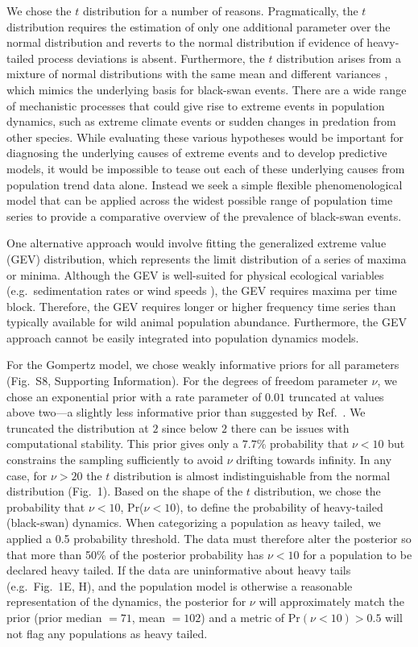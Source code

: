 \documentclass[9pt,twocolumn,twoside]{pnas-new}
\newcommand{\figpriors}{{8}}
\begin{document}
{We chose the $t$ distribution for a number of reasons.
Pragmatically, the $t$ distribution requires the estimation of only one additional
parameter over the normal distribution and reverts to the normal distribution
if evidence of heavy-tailed process deviations is absent.
Furthermore, the $t$ distribution arises from a mixture of normal distributions
with the same mean and different variances \cite{gelman2014},
which mimics the underlying basis for black-swan events.
There are a wide range of mechanistic processes
that could give rise to extreme events in population dynamics,
such as extreme climate events
\cite{meehl2004, katz2005, ipcc2012}
or sudden changes in predation from other species.
While evaluating these various hypotheses
would be important for diagnosing the underlying causes
of extreme events and to develop predictive models,
it would be impossible to tease out each of these
underlying causes from population trend data alone.
Instead we seek a simple flexible phenomenological model
that can be applied across the widest possible
range of population time series to provide a
comparative overview of the prevalence
of black-swan events.

One alternative approach would involve fitting
the generalized extreme value (GEV) distribution,
which represents the limit distribution of a series of maxima or minima.
Although the GEV is well-suited for physical ecological variables
(e.g.\ sedimentation rates or wind speeds \cite{gaines1993, denny2009}),
the GEV requires maxima per time block.
Therefore, the GEV requires longer or higher frequency time series than typically available
for wild animal population abundance.
Furthermore, the GEV approach cannot be easily integrated into population dynamics models.

For the Gompertz model,
we chose weakly informative priors for
all parameters (Fig.~S\figpriors, Supporting Information).
For the degrees of freedom parameter $\nu$,
we chose an exponential prior
with a rate parameter
of \(0.01\) truncated at values above two---a slightly less informative prior
than suggested by Ref.~\cite{fernandez1998}. We truncated the
distribution at \(2\) since
below $2$ there can be issues with computational stability.
This prior gives only a \(7.7\)\% probability that \(\nu < 10\)
but constrains the sampling sufficiently to avoid \(\nu\) drifting towards infinity. In
any case, for \(\nu > 20\) the $t$ distribution is almost indistinguishable from
the normal distribution (Fig.~1). Based on the shape of the $t$ distribution, we
chose the probability that \(\nu < 10\), Pr(\(\nu < 10\)), to define the
probability of heavy-tailed (black-swan) dynamics. When categorizing a population as heavy
tailed, we applied a 0.5 probability threshold.
The data must therefore alter the posterior so that
more than 50\% of the posterior probability has $\nu < 10$ for a
population to be declared heavy tailed. 
If the data
are uninformative about heavy tails (e.g.~Fig.~1E, H), 
and the population model is otherwise a reasonable representation of the dynamics, 
the posterior for
\(\nu\) will approximately match the prior (prior median \(= 71\), mean \(=
102\)) and a metric of Pr\((\nu < 10) > 0.5\) will not flag any
populations as heavy tailed.

}
\end{document}
